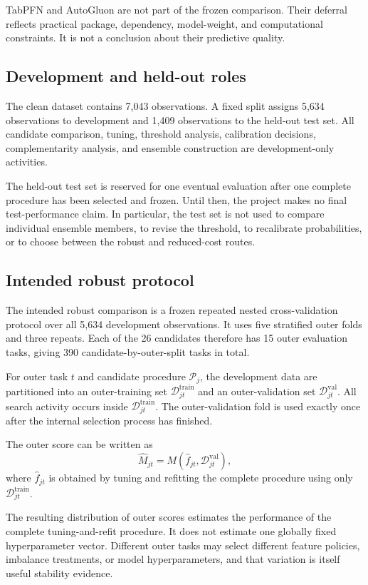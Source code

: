 TabPFN and AutoGluon are not part of the frozen comparison. Their deferral reflects practical package, dependency, model-weight, and computational constraints. It is not a conclusion about their predictive quality.

\subsection{Development and held-out roles}

The clean dataset contains 7,043 observations. A fixed split assigns 5,634 observations to development and 1,409 observations to the held-out test set. All candidate comparison, tuning, threshold analysis, calibration decisions, complementarity analysis, and ensemble construction are development-only activities.

The held-out test set is reserved for one eventual evaluation after one complete procedure has been selected and frozen. Until then, the project makes no final test-performance claim. In particular, the test set is not used to compare individual ensemble members, to revise the threshold, to recalibrate probabilities, or to choose between the robust and reduced-cost routes.

\subsection{Intended robust protocol}

The intended robust comparison is a frozen repeated nested cross-validation protocol over all 5,634 development observations. It uses five stratified outer folds and three repeats. Each of the 26 candidates therefore has 15 outer evaluation tasks, giving 390 candidate-by-outer-split tasks in total.

For outer task $t$ and candidate procedure $\mathcal{P}_j$, the development data are partitioned into an outer-training set $\mathcal{D}^{\mathrm{train}}_{jt}$ and an outer-validation set $\mathcal{D}^{\mathrm{val}}_{jt}$. All search activity occurs inside $\mathcal{D}^{\mathrm{train}}_{jt}$. The outer-validation fold is used exactly once after the internal selection process has finished.

The outer score can be written as
\[
\widehat{M}_{jt}
=
M\left(
\widehat{f}_{jt},
\mathcal{D}^{\mathrm{val}}_{jt}
\right),
\]
where $\widehat{f}_{jt}$ is obtained by tuning and refitting the complete procedure using only $\mathcal{D}^{\mathrm{train}}_{jt}$.

The resulting distribution of outer scores estimates the performance of the complete tuning-and-refit procedure. It does not estimate one globally fixed hyperparameter vector. Different outer tasks may select different feature policies, imbalance treatments, or model hyperparameters, and that variation is itself useful stability evidence.

